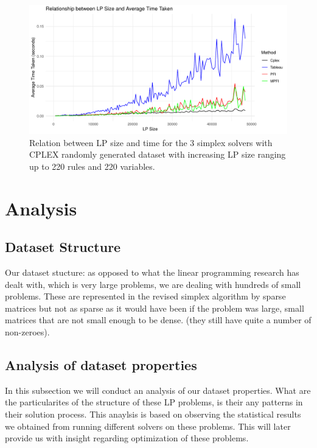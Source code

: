 \begin{figure}[p]
    \includegraphics[width=0.8\paperwidth, height=\paperheight, keepaspectratio]{figures/cplex_vs_all_random_large.pdf}
    \caption{Relation between LP size and time for the 3 simplex solvers with CPLEX randomly generated
    dataset with increasing LP size ranging up to 220 rules and 220 variables.}
    \label{cplex_vs_all_random_large}
\end{figure}
\section{Analysis}

\subsection{Dataset Structure}
Our dataset stucture:
as opposed to what the linear programming research has dealt with, which is
very large problems, we are dealing with hundreds of small problems. These are represented
in the revised simplex algorithm by
sparse matrices but not as sparse as it would have been if the problem was large,
small matrices that are not small enough to be dense.
(they still have quite a number of non-zeroes).

\subsection{Analysis of dataset properties}
In  this subsection we will conduct an analysis of our dataset properties. What are the
particularites of the structure of these LP problems, is their any patterns in their solution
process. This anaylsis is based on observing the statistical results we obtained from
running different solvers on these problems. This will later provide us with insight
regarding optimization of these problems.

